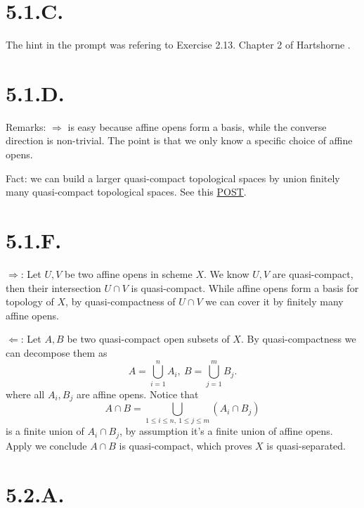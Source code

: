 \section{5.1.C.}

The hint in the prompt was refering to Exercise 2.13.  Chapter 2 of Hartshorne \cite{hartshorne2013algebraic}.

\section{5.1.D.}\label{5.1.D.}

Remarks: $\Rightarrow$ is easy because affine opens form a basis, while the converse direction is non-trivial. The point is that we only know a specific choice of affine opens. 

Fact: we can build a larger quasi-compact topological spaces by union finitely many quasi-compact topological spaces. See this \href{https://math.stackexchange.com/questions/816938/quasicompact-scheme-are-finite-union-of-affine-scheme}{POST}.

\section{5.1.F.}

$\Rightarrow$: Let $U,V$ be two affine opens in scheme $X$. We know $U,V$ are quasi-compact, then their intersection $U\cap V$ is quasi-compact. While affine opens form a basis for topology of $X$, by quasi-compactness of $U\cap V$ we can cover it by finitely many affine opens. 

$\Leftarrow$: Let $A,B$ be two quasi-compact open subsets of $X$. By quasi-compactness we can decompose them as 
\[A=\bigcup_{i=1}^n A_i,~ B=\bigcup_{j=1}^m B_j.\] where all $A_i,B_j$ are affine opens. 
Notice that \[A\cap B=\bigcup_{1\leq i\leq n,~ 1\leq j\leq m}(A_i\cap B_j)\] is a finite union of $A_i\cap B_j$, by assumption it's a finite union of affine opens. Apply  we conclude $A\cap B$ is quasi-compact, which proves $X$ is quasi-separated.

\section{5.2.A.}

